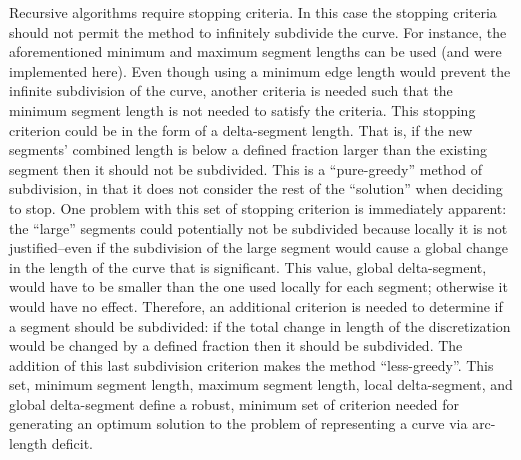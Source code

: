 Recursive algorithms require stopping criteria.  In this case the stopping 
criteria should not permit the method to infinitely subdivide the curve.  
For instance, the aforementioned minimum and maximum segment lengths can 
be used (and were implemented here).  Even though using a minimum edge 
length would prevent the infinite subdivision of the curve, another 
criteria is needed such that the minimum segment length is not needed to satisfy the criteria.  This stopping criterion could be in the form of a delta-segment length.  That is, if the new segments’ combined length is below a defined fraction larger than the existing segment then it should not be subdivided.  This is a ``pure-greedy'' method of subdivision, in that it does not consider the rest of the ``solution'' when deciding to stop.  One problem with this set of stopping criterion is immediately apparent: the ``large'' segments could potentially not be subdivided because locally it is not justified--even if the subdivision of the large segment would cause a global change in the length of the curve that is significant.  This value, global delta-segment, would have to be smaller than the one used locally for each segment; otherwise it would have no effect.  Therefore, an additional criterion is needed to determine if a segment should be subdivided: if the total change in length of the discretization would be changed by a defined fraction then it should be subdivided.  The addition of this last subdivision criterion makes the method ``less-greedy''.  This set, minimum segment length, maximum segment length, local delta-segment, and global delta-segment define a robust, minimum set of criterion needed for generating an optimum solution to the problem of representing a curve via arc-length deficit.

